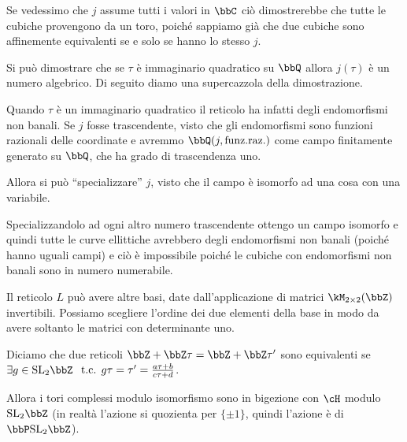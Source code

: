 \begin{osservazione} \label{170123-j_suriettiva}
  Se vedessimo che $j$ assume tutti i valori in $\bbC$ ciò dimostrerebbe
  che tutte le cubiche provengono da un toro, poiché sappiamo già che
  due cubiche sono affinemente equivalenti se e solo se hanno lo stesso $j$.
\end{osservazione}

\begin{divagazione}
  Si può dimostrare che se $\tau$ è immaginario quadratico su $\bbQ$ allora
  $j(\tau)$ è un numero algebrico. Di seguito diamo una supercazzola della dimostrazione.

  Quando $\tau$ è un immaginario quadratico il reticolo ha infatti degli
  endomorfismi non banali. Se $j$ fosse trascendente, visto che gli
  endomorfismi sono funzioni razionali delle coordinate e avremmo
  $\bbQ(j, \text{funz.raz.})$ come campo finitamente generato su $\bbQ$,
  che ha grado di trascendenza uno.

  Allora si può ``specializzare'' $j$, visto che il campo è isomorfo ad
  una cosa con una variabile.

  
  Specializzandolo ad ogni altro numero trascendente ottengo un campo
  isomorfo e quindi tutte le curve ellittiche avrebbero degli
  endomorfismi non banali (poiché hanno uguali campi) e ciò è
  impossibile poiché le cubiche con endomorfismi non banali sono in numero
  numerabile.
\end{divagazione}

Il reticolo $L$ può avere altre basi, date dall'applicazione di matrici
$\kM_{2 \times 2} (\bbZ)$ invertibili. Possiamo scegliere l'ordine dei
due elementi della base in modo da avere soltanto le matrici con
determinante uno.

Diciamo che due reticoli $\bbZ + \bbZ \tau = \bbZ + \bbZ \tau'$ sono
equivalenti se $\exists g \in \SL_2 \bbZ$
$\text{ t.c. } g\tau = \tau' = \frac{a \tau + b}{c \tau + d}$.

Allora i tori complessi modulo isomorfismo sono in bigezione con $\cH$
modulo $\SL_2 \bbZ$ (in realtà l'azione si quozienta per $\{\pm 1\}$,
quindi l'azione è di $\bbP\SL_2 \bbZ$).

